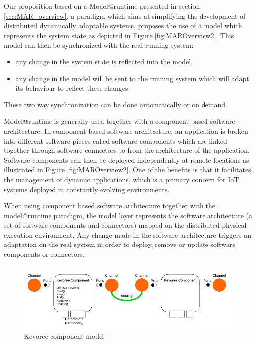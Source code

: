 Our proposition based on a Model@runtime \cite{morin2009mar} presented in section \ref{sec:MAR_overview}, a paradigm which aims at simplifying the development of distributed dynamically adaptable systems, proposes the use of a model which represents the system state as depicted in Figure \ref{fig:MAROverview2}. 
This model can then be synchronized with the real running system: 
\begin{itemize}
	\item any change in the system state is reflected into the model,
	\item any change in the model will be sent to the running system which will adapt its behaviour to reflect these changes. 
\end{itemize}
These two way synchronization can be done automatically or on demand.

Model@runtime is generally used together with a component based software architecture.
In component based software architecture, an application is broken into different software pieces called software components which are linked together through software connectors  \cite{dashofy2002infrastructure,medvidovic2000classification,van2000koala} to from the architecture of the application.
Software components can then be deployed independently at remote locations as illustrated in Figure \ref{fig:MAROverview2}. 
One of the benefits is that it facilitates the management of dynamic applications, which is a primary concern for IoT systems deployed in constantly evolving environments.



When using component based software architecture together with the model@runtime paradigm, the model layer represents the software architecture (a set of software components and connectors) mapped on the distributed physical execution environment.
Any change made in the software architecture triggers an adaptation on the real system in order to deploy, remove or update software components or connectors.   

\begin{figure}[htb]
	\centering
	\includegraphics[width=0.95\columnwidth]{chapters/inter-node.images/componentModel.pdf}
	\caption{Kevoree component model} \label{fig:kevCompModel}
\end{figure}

